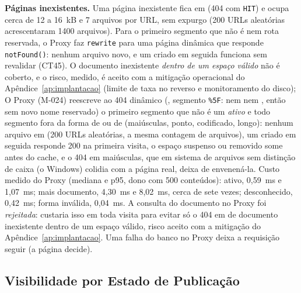 \textbf{Páginas inexistentes.} Uma página inexistente fica em  (404 com \texttt{HIT}) e ocupa cerca de 12 a 16~kB e 7 arquivos por URL, sem expurgo (200 URLs aleatórias acrescentaram 1400 arquivos). Para o primeiro segmento que não é  nem rota reservada, o Proxy faz \texttt{rewrite} para uma página dinâmica que responde \texttt{notFound()}: nenhum arquivo novo, e um  criado em seguida funciona sem revalidar (CT45). O documento inexistente \emph{dentro de um espaço válido} não é coberto, e o risco, medido, é aceito com a mitigação operacional do Apêndice~\ref{ap:implantacao} (limite de taxa no  reverso e monitoramento do disco); O Proxy (M-024) reescreve ao 404 dinâmico (, segmento \texttt{\%5F}: nem  nem , então sem novo nome reservado) o primeiro segmento que não é um  \emph{ativo} e todo segmento fora da forma de  ou de  (maiúsculas, ponto, codificado, longo): nenhum arquivo em  (200 URLs aleatórias, a mesma contagem de arquivos), um  criado em seguida responde 200 na primeira visita, o espaço suspenso ou removido some antes do cache, e o 404 em maiúsculas, que em sistema de arquivos sem distinção de caixa (o Windows) colidia com a página real, deixa de envenená-la. Custo medido do Proxy (mediana e p95, dono com 500 conteúdos):  ativo, 0,59~ms e 1,07~ms;  mais documento, 4,30~ms e 8,02~ms, cerca de sete vezes;  desconhecido, 0,42~ms; forma inválida, 0,04~ms. A consulta do documento no Proxy foi \emph{rejeitada}: custaria isso em toda visita para evitar só o 404 em  de documento inexistente dentro de um espaço válido, risco aceito com a mitigação do Apêndice~\ref{ap:implantacao}. Uma falha do banco no Proxy deixa a requisição seguir (a página decide).

\subsection{Visibilidade por Estado de Publicação}\label{sec:arq-visibilidade}

